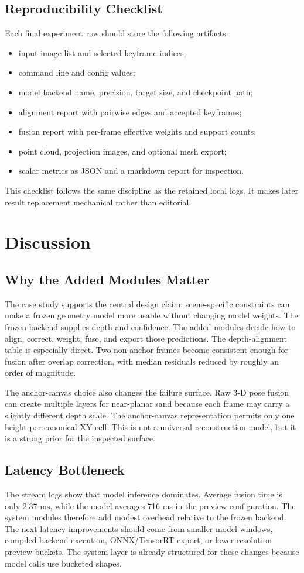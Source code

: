 \documentclass[conference]{IEEEtran}
\begin{document}
\subsection{Reproducibility Checklist}
Each final experiment row should store the following artifacts:
\begin{itemize}
\item input image list and selected keyframe indices;
\item command line and config values;
\item model backend name, precision, target size, and checkpoint path;
\item alignment report with pairwise edges and accepted keyframes;
\item fusion report with per-frame effective weights and support counts;
\item point cloud, projection images, and optional mesh export;
\item scalar metrics as JSON and a markdown report for inspection.
\end{itemize}
This checklist follows the same discipline as the retained local logs. It makes later result replacement mechanical rather than editorial.

\section{Discussion}
\subsection{Why the Added Modules Matter}
The case study supports the central design claim: scene-specific constraints can make a frozen geometry model more usable without changing model weights. The frozen backend supplies depth and confidence. The added modules decide how to align, correct, weight, fuse, and export those predictions. The depth-alignment table is especially direct. Two non-anchor frames become consistent enough for fusion after overlap correction, with median residuals reduced by roughly an order of magnitude.

The anchor-canvas choice also changes the failure surface. Raw 3-D pose fusion can create multiple layers for near-planar sand because each frame may carry a slightly different depth scale. The anchor-canvas representation permits only one height per canonical XY cell. This is not a universal reconstruction model, but it is a strong prior for the inspected surface.

\subsection{Latency Bottleneck}
The stream logs show that model inference dominates. Average fusion time is only 2.37 ms, while the model averages 716 ms in the preview configuration. The system modules therefore add modest overhead relative to the frozen backend. The next latency improvements should come from smaller model windows, compiled backend execution, ONNX/TensorRT export, or lower-resolution preview buckets. The system layer is already structured for these changes because model calls use bucketed shapes.
\end{document}
